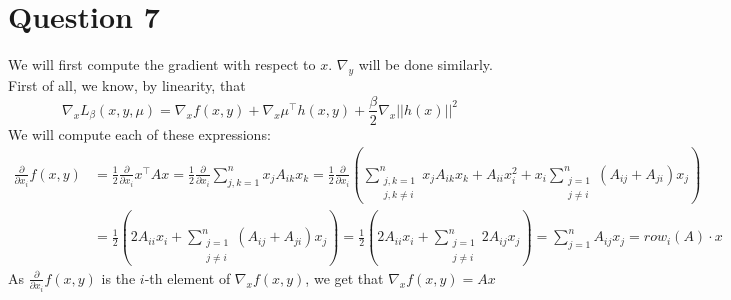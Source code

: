 \documentclass{article}
\newcommand{\R}{\mathbb{R}}
\newcommand{\tp}{^\top}
\newcommand{\p}{\frac{\partial}{\partial x_i}}
\begin{document}
\begin{comment}
So we may take $(x^*,  y^*) = (v_{\min }(A), v_{\min} (B))$, where $v_{\min }(A)$ and $v_{\min }(B)$ are the unit-normed eigenvectors of $\lambda_{\min}(A)$ and $\lambda_{\max}(B)$ respectively. \\
At this point, we need to recall that $(x^*,y^*)$ must belong to the set $S$, or equivalently we must have $h(x^*,y^*)=0$. By taking unit-normed eigenvectors, we ensure that $h_1(x^*,y^*)=0=h_2(x^*,y^*)$. The last condition is $h_3(x^*,y^*) = 0$. By definition of $h_3$, this means $(x^*)\tp y^* = 0$, i.e. $x^*$ and $y^*$ need to be orthogonal in $\R^n$. This is the only assumption we do not know, but observe that as soon as we know it the previous reasoning implies that the assumptions of the strong duality theorem are satisfied.\\

Hence, we can always find $\mu^*\in\R^3$ such that $(\text{A}2)$ is satisfied, but we cannot always ensure that $(\text{A}1)$ is satisfied. One condition that can ensure it however, is that the eigenvectors of $A$ and $B$ corresponding to their smallest eigenvalues are orthogonal. We can not expect to have this before solving the problem if we don't have specific informations about $A$ and $B$ other that them being symmetric.
\end{comment}



\section*{Question 7}


We will first compute the gradient with respect to $x$. $\nabla_y$ will be done similarly.\\
First of all, we know, by linearity, that 
$$\nabla_x L_{\beta}(x,y,\mu)=\nabla_x f(x,y) + \nabla_x \mu\tp h(x,y)+ \frac{\beta}{2} \nabla_x ||h(x)||^2$$
We will compute each of these expressions:\\
\begin{align*}
\p f(x,y)&=\frac{1}{2} \p x\tp A x=\frac{1}{2} \p \sum_{j,k=1}^n x_j A_{ik} x_k=\frac{1}{2} \p \left( \sum_{\substack{j,k=1\\ j,k\neq i}}^n x_j A_{ik} x_k+A_{ii}x_i^2+ x_i \sum_{\substack{j=1 \\ j\neq i}}^n (A_{ij}+A_{ji})x_j \right)\\
&=\frac{1}{2}\left( 2 A_{ii} x_i +  \sum_{\substack{j=1 \\ j\neq i}}^n (A_{ij}+A_{ji})x_j \right)=\frac{1}{2}\left( 2 A_{ii} x_i +  \sum_{\substack{j=1 \\ j\neq i}}^n 2 A_{ij}x_j \right)= \sum_{j=1}^n  A_{ij}x_j =row_i (A) \cdot x
\end{align*}
As $\p f(x,y)$ is the $i$-th element of $\nabla_x f(x,y)$, we get that $\nabla_x f(x,y)= Ax$ \\
\end{document}
